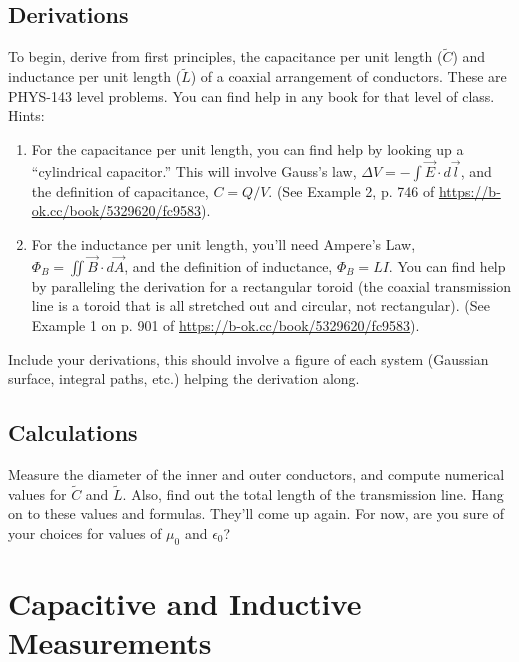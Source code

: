\documentclass[12pt]{article}
\begin{document}
\subsection{Derivations}

To begin, derive from first principles, the capacitance per unit length (${\tilde C}$) and inductance per unit length (${\tilde L}$) of a coaxial arrangement of conductors. These are PHYS-143 level problems. You can find help in any book for that level of class. Hints:

\begin{enumerate}

\item For the capacitance per unit length, you can find help by looking up a ``cylindrical capacitor.'' This will involve Gauss's law, $\Delta V=-\int {\vec E}\cdot d{\vec l}$, and the definition of capacitance, $C=Q/V$. (See Example 2, p. 746 of \url{https://b-ok.cc/book/5329620/fc9583}).

\item For the inductance per unit length, you'll need Ampere's Law,  $\Phi_B=\iint {\vec B}\cdot d{\vec A}$, and the definition of inductance, $\Phi_B=LI$. You can find help by paralleling the derivation for a rectangular toroid (the coaxial transmission line is a toroid that is all stretched out and circular, not rectangular). (See Example 1 on p. 901 of \url{https://b-ok.cc/book/5329620/fc9583}).

\end{enumerate}

Include your derivations, this should involve a figure of each system (Gaussian surface, integral paths, etc.) helping the derivation along.

\subsection{Calculations}

Measure the diameter of the inner and outer conductors, and compute numerical values for  ${\tilde C}$ and  ${\tilde L}$.  Also, find out the total length of the transmission line.  Hang on to these values and formulas. They'll come up again. For now, are you sure of your choices for values of $\mu_0$ and $\epsilon_0$?

\section{Capacitive and Inductive Measurements}
\end{document}

